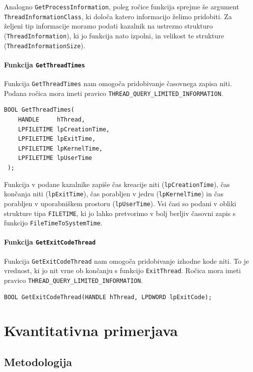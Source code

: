 \documentclass[a4paper,12pt,openright]{book}
\begin{document}
Analogno \texttt{GetProcessInformation}, poleg ročice funkcija sprejme še argument \texttt{ThreadInformationClass}, ki določa katero informacijo želimo pridobiti.
Za željeni tip informacije moramo podati kazalnik na ustrezno strukturo (\texttt{ThreadInformation}), ki jo funkcija nato izpolni, in velikost te strukture (\texttt{ThreadInformationSize}).

\subsubsection{Funkcija \texttt{GetThreadTimes}}

Funkcija \texttt{GetThreadTimes} nam omogoča pridobivanje časovnega zapisa niti.
Podana ročica mora imeti pravico \texttt{THREAD\_QUERY\_LIMITED\_INFORMATION}.

\begin{lstlisting}[style=func]
 BOOL GetThreadTimes(
	HANDLE     hThread,
	LPFILETIME lpCreationTime,
	LPFILETIME lpExitTime,
	LPFILETIME lpKernelTime,
	LPFILETIME lpUserTime
 );
\end{lstlisting}

Funkcija v podane kazalnike zapiše čas kreacije niti (\texttt{lpCreationTime}), čas končanja niti (\texttt{lpExitTime}), čas porabljen v jedru (\texttt{lpKernelTime}) in čas porabljen v uporabniškem prostoru (\texttt{lpUserTime}).
Vsi časi so podani v obliki strukture tipa \texttt{FILETIME}, ki jo lahko pretvorimo v bolj berljiv časovni zapis s funkcijo \texttt{FileTimeToSystemTime}.

\subsubsection{Funkcija \texttt{GetExitCodeThread}}

Funkcija \texttt{GetExitCodeThread} nam omogoča pridobivanje izhodne kode niti.
To je vrednost, ki jo nit vrne ob končanju s funkcijo \texttt{ExitThread}.
Ročica mora imeti pravico \texttt{THREAD\_QUERY\_LIMITED\_INFORMATION}.

\begin{lstlisting}[style=func]
 BOOL GetExitCodeThread(HANDLE hThread, LPDWORD lpExitCode);
\end{lstlisting}

\chapter{Kvantitativna primerjava}

\section{Metodologija}
\end{document}
